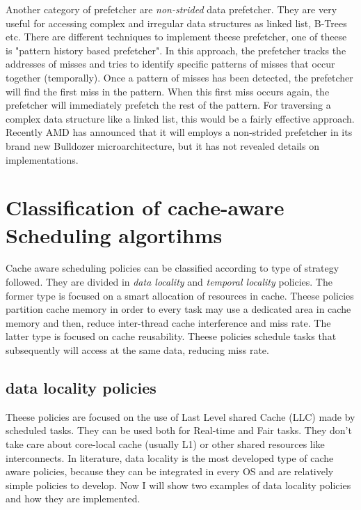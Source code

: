 Another category of prefetcher are \textit{non-strided} data prefetcher. They are very useful for accessing complex and irregular data structures as 
linked list, B-Trees etc. There are different techniques to implement theese prefetcher, one of theese is "pattern history based prefetcher". 
In this approach, the prefetcher tracks the addresses of misses and tries to identify specific patterns of misses that occur together (temporally). 
Once a pattern of misses has been detected, the prefetcher will find the first miss in the pattern. When this first miss occurs again, the prefetcher 
will immediately prefetch the rest of the pattern. For traversing a complex data structure like a linked list, this would be a fairly effective approach.
Recently AMD has announced that it will employs a non-strided prefetcher in its brand new Bulldozer microarchitecture, but it has not revealed details on 
implementations.

\section{Classification of cache-aware Scheduling algortihms}

Cache aware scheduling policies can be classified according to type of strategy followed. They are divided in \textit{data locality} and 
\textit{temporal locality} policies. The former type is focused on a smart allocation of resources in cache. Theese policies partition cache memory in order
to every task may use a dedicated area in cache memory and then, reduce inter-thread cache interference and miss rate.
The latter type is focused on cache reusability. Theese policies schedule tasks that subsequently will access at the same data, reducing miss rate.

\subsection{data locality policies} 

Theese policies are focused on the use of Last Level shared Cache (LLC) made by scheduled tasks. They can be used both for Real-time and Fair tasks. 
They don't take care about core-local cache (usually L1) or other shared resources like interconnects. In literature, data locality is the most developed 
type of cache aware policies, because they can be integrated in every OS and are relatively simple policies to develop. Now I will show two examples of 
data locality policies and how they are implemented.

